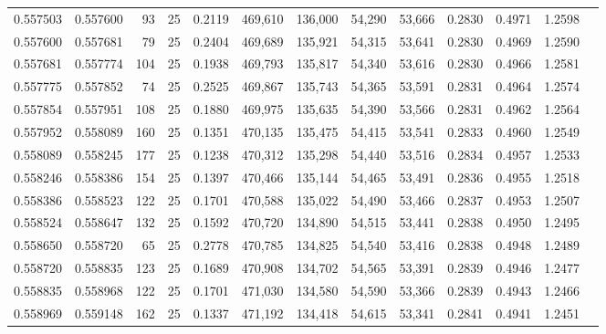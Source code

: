 \begin{tabular}{rrrrrrrrrrrrr}
0.557503 & 0.557600 &    93 &  25 &                                     0.2119 & 469,610 & 136,000 &  54,290 &  53,666 & 0.2830 & 0.4971 & 1.2598 \\
0.557600 & 0.557681 &    79 &  25 &                                     0.2404 & 469,689 & 135,921 &  54,315 &  53,641 & 0.2830 & 0.4969 & 1.2590 \\
0.557681 & 0.557774 &   104 &  25 &                                     0.1938 & 469,793 & 135,817 &  54,340 &  53,616 & 0.2830 & 0.4966 & 1.2581 \\
0.557775 & 0.557852 &    74 &  25 &                                     0.2525 & 469,867 & 135,743 &  54,365 &  53,591 & 0.2831 & 0.4964 & 1.2574 \\
0.557854 & 0.557951 &   108 &  25 &                                     0.1880 & 469,975 & 135,635 &  54,390 &  53,566 & 0.2831 & 0.4962 & 1.2564 \\
0.557952 & 0.558089 &   160 &  25 &                                     0.1351 & 470,135 & 135,475 &  54,415 &  53,541 & 0.2833 & 0.4960 & 1.2549 \\
0.558089 & 0.558245 &   177 &  25 &                                     0.1238 & 470,312 & 135,298 &  54,440 &  53,516 & 0.2834 & 0.4957 & 1.2533 \\
0.558246 & 0.558386 &   154 &  25 &                                     0.1397 & 470,466 & 135,144 &  54,465 &  53,491 & 0.2836 & 0.4955 & 1.2518 \\
0.558386 & 0.558523 &   122 &  25 &                                     0.1701 & 470,588 & 135,022 &  54,490 &  53,466 & 0.2837 & 0.4953 & 1.2507 \\
0.558524 & 0.558647 &   132 &  25 &                                     0.1592 & 470,720 & 134,890 &  54,515 &  53,441 & 0.2838 & 0.4950 & 1.2495 \\
0.558650 & 0.558720 &    65 &  25 &                                     0.2778 & 470,785 & 134,825 &  54,540 &  53,416 & 0.2838 & 0.4948 & 1.2489 \\
0.558720 & 0.558835 &   123 &  25 &                                     0.1689 & 470,908 & 134,702 &  54,565 &  53,391 & 0.2839 & 0.4946 & 1.2477 \\
0.558835 & 0.558968 &   122 &  25 &                                     0.1701 & 471,030 & 134,580 &  54,590 &  53,366 & 0.2839 & 0.4943 & 1.2466 \\
0.558969 & 0.559148 &   162 &  25 &                                     0.1337 & 471,192 & 134,418 &  54,615 &  53,341 & 0.2841 & 0.4941 & 1.2451 \\

\end{tabular}
